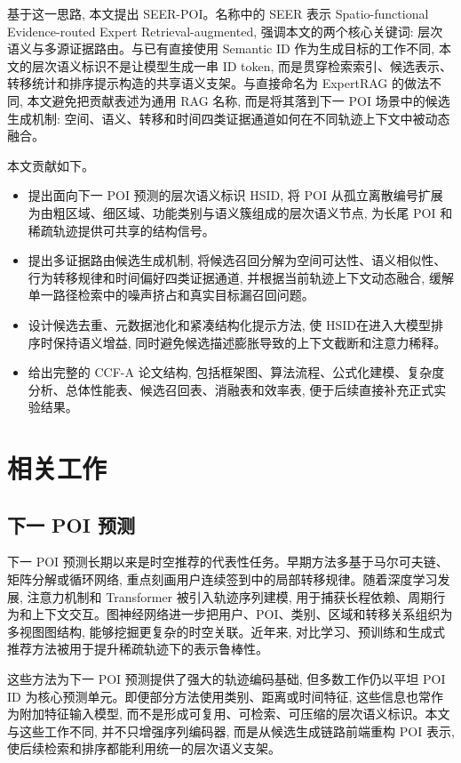 \documentclass[10pt,twocolumn,fontset=none]{ctexart}
\newcommand{\method}{SEER-POI}
\newcommand{\hsid}{HSID}
\begin{document}
基于这一思路, 本文提出 \method。名称中的 SEER 表示 Spatio-functional Evidence-routed Expert Retrieval-augmented, 强调本文的两个核心关键词: 层次语义与多源证据路由。与已有直接使用 Semantic ID 作为生成目标的工作不同, 本文的层次语义标识不是让模型生成一串 ID token, 而是贯穿检索索引、候选表示、转移统计和排序提示构造的共享语义支架。与直接命名为 ExpertRAG 的做法不同, 本文避免把贡献表述为通用 RAG 名称, 而是将其落到下一 POI 场景中的候选生成机制: 空间、语义、转移和时间四类证据通道如何在不同轨迹上下文中被动态融合。

本文贡献如下。
\begin{itemize}
    \item 提出面向下一 POI 预测的层次语义标识 \hsid, 将 POI 从孤立离散编号扩展为由粗区域、细区域、功能类别与语义簇组成的层次语义节点, 为长尾 POI 和稀疏轨迹提供可共享的结构信号。
    \item 提出多证据路由候选生成机制, 将候选召回分解为空间可达性、语义相似性、行为转移规律和时间偏好四类证据通道, 并根据当前轨迹上下文动态融合, 缓解单一路径检索中的噪声挤占和真实目标漏召回问题。
    \item 设计候选去重、元数据池化和紧凑结构化提示方法, 使 \hsid 在进入大模型排序时保持语义增益, 同时避免候选描述膨胀导致的上下文截断和注意力稀释。
    \item 给出完整的 CCF-A 论文结构, 包括框架图、算法流程、公式化建模、复杂度分析、总体性能表、候选召回表、消融表和效率表, 便于后续直接补充正式实验结果。
\end{itemize}

\section{相关工作}

\subsection{下一 POI 预测}
下一 POI 预测长期以来是时空推荐的代表性任务。早期方法多基于马尔可夫链、矩阵分解或循环网络, 重点刻画用户连续签到中的局部转移规律。随着深度学习发展, 注意力机制和 Transformer 被引入轨迹序列建模, 用于捕获长程依赖、周期行为和上下文交互。图神经网络进一步把用户、POI、类别、区域和转移关系组织为多视图图结构, 能够挖掘更复杂的时空关联。近年来, 对比学习、预训练和生成式推荐方法被用于提升稀疏轨迹下的表示鲁棒性。

这些方法为下一 POI 预测提供了强大的轨迹编码基础, 但多数工作仍以平坦 POI ID 为核心预测单元。即便部分方法使用类别、距离或时间特征, 这些信息也常作为附加特征输入模型, 而不是形成可复用、可检索、可压缩的层次语义标识。本文与这些工作不同, 并不只增强序列编码器, 而是从候选生成链路前端重构 POI 表示, 使后续检索和排序都能利用统一的层次语义支架。
\end{document}
